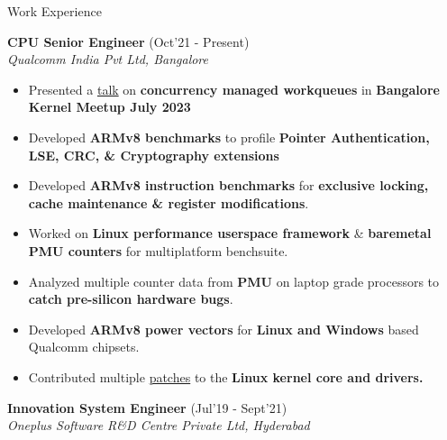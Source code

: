 \begin{rSection}{Work Experience}

\vspace{-.4cm}
 
\item{\bf {\bf CPU Senior Engineer}}     \hfill{(Oct'21 - Present)}\\
\emph{Qualcomm India Pvt Ltd, Bangalore}\\
\vspace{-.01cm}

	\def \talkurl{https://kernelmeetup.wordpress.com/2023/08/01/bangalore-kernel-meetup-july-2023-a-report/}
	\def \patchesurl{https://lore.kernel.org/all/?q=prathu+baronia}

\begin{itemize}[leftmargin=*]

	\itemsep \sepval
	
	\item Presented a \href{\talkurl}{talk} on {\bf concurrency managed workqueues} in {\bf Bangalore Kernel Meetup July 2023}

	\item Developed {\bf ARMv8 benchmarks} to profile {\bf Pointer Authentication, LSE, CRC, \& Cryptography extensions}

	\item Developed {\bf ARMv8 instruction benchmarks} for {\bf exclusive locking, cache maintenance \& register modifications}.

	\item Worked on {\bf Linux performance userspace framework} \& {\bf baremetal PMU counters} for multiplatform benchsuite.

	\item Analyzed multiple counter data from {\bf PMU} on laptop grade processors to {\bf catch pre-silicon hardware bugs}.

	\item Developed {\bf ARMv8 power vectors} for {\bf Linux and Windows} based Qualcomm chipsets.

	\item Contributed multiple \href{\patchesurl}{patches} to the \bf{Linux kernel core and drivers}.
	
\end{itemize}
\vspace{-.2cm}

\item{\bf {\bf Innovation System Engineer}}  \hfill{(Jul'19 - Sept'21)}\\
\emph{Oneplus Software R\&D Centre Private Ltd, Hyderabad}\\
\vspace{-.01cm}


\end{rSection}
